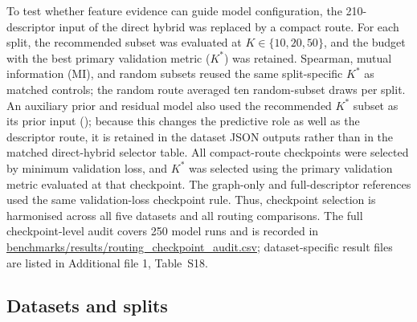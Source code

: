 To test whether feature evidence can guide model configuration, the 210-descriptor input of the direct hybrid was replaced by a compact route. For each split, the recommended subset was evaluated at $K\in\{10,20,50\}$, and the budget with the best primary validation metric ($K^*$) was retained. Spearman, mutual information (MI), and random subsets reused the same split-specific $K^*$ as matched controls; the random route averaged ten random-subset draws per split. An auxiliary prior and residual model also used the recommended $K^*$ subset as its prior input (); because this changes the predictive role as well as the descriptor route, it is retained in the dataset JSON outputs rather than in the matched direct-hybrid selector table. All compact-route checkpoints were selected by minimum validation loss, and $K^*$ was selected using the primary validation metric evaluated at that checkpoint. The graph-only and full-descriptor references used the same validation-loss checkpoint rule. Thus, checkpoint selection is harmonised across all five datasets and all routing comparisons. The full checkpoint-level audit covers 250 model runs and is recorded in \url{benchmarks/results/routing_checkpoint_audit.csv}; dataset-specific result files are listed in Additional file 1, Table~S18.

\subsection{Datasets and splits}\label{subsec:datasets}

